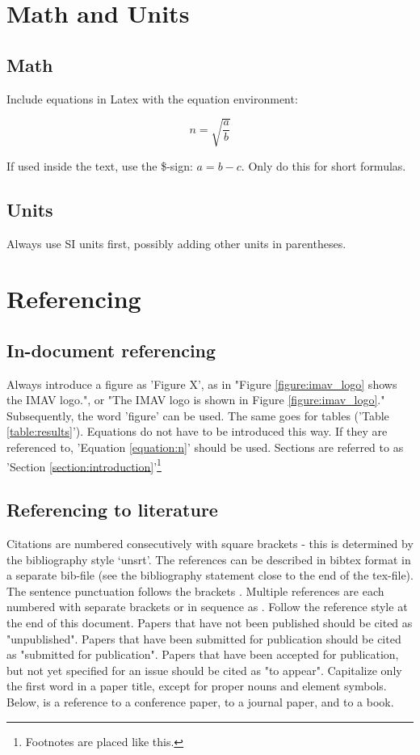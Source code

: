 \documentclass{article}
\begin{document}
\section{Math and Units}

\subsection{Math}
Include equations in Latex with the equation environment:

\begin{equation} \label{equation:n}
n = \sqrt{\frac{a}{b}}
\end{equation}

If used inside the text, use the \$-sign: $a = b-c$. Only do this for short formulas.

\subsection{Units}
Always use SI units first, possibly adding other units in parentheses.

\section{Referencing}

\subsection{In-document referencing}
Always introduce a figure as 'Figure X', as in "Figure \ref{figure:imav_logo} shows the IMAV logo.", or "The IMAV logo is shown in Figure \ref{figure:imav_logo}." Subsequently, the word 'figure' can be used. The same goes for tables ('Table \ref{table:results}'). Equations do not have to be introduced this way. If they are referenced to, 'Equation \ref{equation:n}' should be used. Sections are referred to as 'Section \ref{section:introduction}'\footnote{Footnotes are placed like this.}

\subsection{Referencing to literature}
 Citations are numbered consecutively with square brackets \cite{DEWAGTER2014} - this is determined by the bibliography style `unsrt'. The references can be described in bibtex format in a separate bib-file (see the bibliography statement close to the end of the tex-file).  The sentence punctuation follows the brackets \cite{NOLFIPOWLIM}. Multiple references \cite{DEWAGTER2014,NOLFIPOWLIM} are each numbered with separate brackets or in sequence as \cite{DEWAGTER2014,NOLFIPOWLIM,BISHOP2006}.
Follow the reference style at the end of this document. Papers that have not been published should be cited as "unpublished". Papers that have been submitted for publication should be cited as "submitted for publication". Papers that have been accepted for publication, but not yet specified for an issue should be cited as "to appear". Capitalize only the first word in a paper title, except for proper nouns and element symbols.
Below, \cite{DEWAGTER2014} is a reference to a conference paper, \cite{NOLFIPOWLIM} to a journal paper, and \cite{BISHOP2006} to a book.
\end{document}
